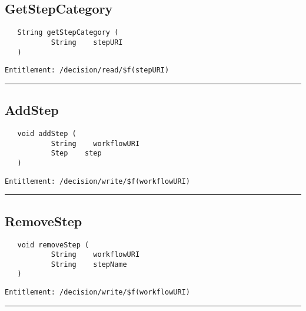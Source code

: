 \subsection{GetStepCategory}
\label{Api:GetStepCategory}
\begin{Verbatim}
   String getStepCategory (
           String    stepURI
   )
\end{Verbatim}
\begin{Verbatim}[formatcom=\color{Maroon}]
  Entitlement: /decision/read/$f(stepURI)
\end{Verbatim}



\rule{12cm}{2pt}
\subsection{AddStep}
\label{Api:AddStep}
\begin{Verbatim}
   void addStep (
           String    workflowURI
           Step    step
   )
\end{Verbatim}
\begin{Verbatim}[formatcom=\color{Maroon}]
  Entitlement: /decision/write/$f(workflowURI)
\end{Verbatim}



\rule{12cm}{2pt}
\subsection{RemoveStep}
\label{Api:RemoveStep}
\begin{Verbatim}
   void removeStep (
           String    workflowURI
           String    stepName
   )
\end{Verbatim}
\begin{Verbatim}[formatcom=\color{Maroon}]
  Entitlement: /decision/write/$f(workflowURI)
\end{Verbatim}



\rule{12cm}{2pt}
